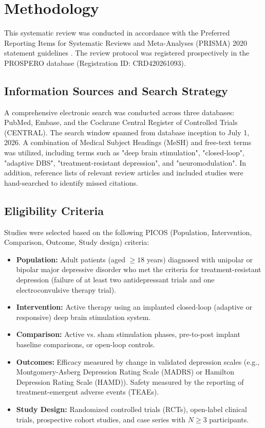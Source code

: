 \section{Methodology}
This systematic review was conducted in accordance with the Preferred Reporting Items for Systematic Reviews and Meta-Analyses (PRISMA) 2020 statement guidelines \citep{PRISMA2020}. The review protocol was registered prospectively in the PROSPERO database (Registration ID: CRD420261093).

\subsection{Information Sources and Search Strategy}
A comprehensive electronic search was conducted across three databases: PubMed, Embase, and the Cochrane Central Register of Controlled Trials (CENTRAL). The search window spanned from database inception to July 1, 2026. A combination of Medical Subject Headings (MeSH) and free-text terms was utilized, including terms such as "deep brain stimulation", "closed-loop", "adaptive DBS", "treatment-resistant depression", and "neuromodulation". In addition, reference lists of relevant review articles and included studies were hand-searched to identify missed citations.

\subsection{Eligibility Criteria}
Studies were selected based on the following PICOS (Population, Intervention, Comparison, Outcome, Study design) criteria:
\begin{itemize}
  \item \textbf{Population:} Adult patients (aged $\ge 18$ years) diagnosed with unipolar or bipolar major depressive disorder who met the criteria for treatment-resistant depression (failure of at least two antidepressant trials and one electroconvulsive therapy trial).
  \item \textbf{Intervention:} Active therapy using an implanted closed-loop (adaptive or responsive) deep brain stimulation system.
  \item \textbf{Comparison:} Active vs. sham stimulation phases, pre-to-post implant baseline comparisons, or open-loop controls.
  \item \textbf{Outcomes:} Efficacy measured by change in validated depression scales (e.g., Montgomery-Asberg Depression Rating Scale (MADRS) or Hamilton Depression Rating Scale (HAMD)). Safety measured by the reporting of treatment-emergent adverse events (TEAEs).
  \item \textbf{Study Design:} Randomized controlled trials (RCTs), open-label clinical trials, prospective cohort studies, and case series with $N \ge 3$ participants.
\end{itemize}

